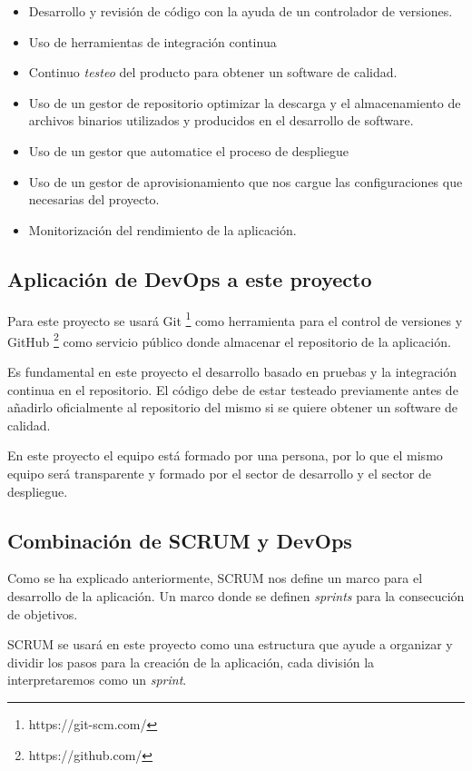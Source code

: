 \begin{itemize}
    \item Desarrollo y revisión de código con la ayuda de un controlador de versiones.
    \item Uso de herramientas de integración continua
    \item Continuo \textit{testeo} del producto para obtener un software de calidad.
    \item Uso de un gestor de repositorio optimizar la descarga y el almacenamiento de archivos binarios utilizados y producidos en el desarrollo de software.
    \item Uso de un gestor que automatice el proceso de despliegue
    \item Uso de un gestor de aprovisionamiento que nos cargue las configuraciones que necesarias del proyecto.
    \item Monitorización del rendimiento de la aplicación.
\end{itemize}

\subsection{Aplicación de DevOps a este proyecto}

Para este proyecto se usará Git \footnote{https://git-scm.com/} como herramienta para el control de versiones y GitHub \footnote{https://github.com/} como servicio público donde almacenar el repositorio de la aplicación.

Es fundamental en este proyecto el desarrollo basado en pruebas y la integración continua en el repositorio. El código debe de estar testeado previamente antes de añadirlo oficialmente al repositorio del mismo si se quiere obtener un software de calidad.

En este proyecto el equipo está formado por una persona, por lo que el mismo equipo será transparente y formado por el sector de desarrollo y el sector de despliegue.


\subsection{Combinación de SCRUM y DevOps}

Como se ha explicado anteriormente, SCRUM nos define un marco para el desarrollo de la aplicación. Un marco donde se definen \textit{sprints} para la consecución de objetivos.

SCRUM se usará en este proyecto como una estructura que ayude a organizar y dividir los pasos para la creación de la aplicación, cada división la interpretaremos como un \textit{sprint}.

